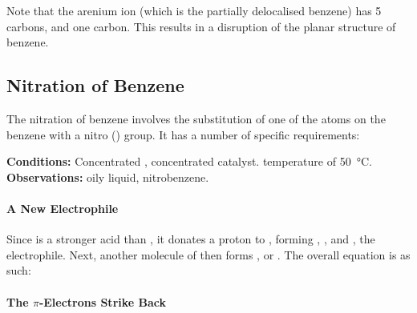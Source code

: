 		Note that the arenium ion (which is the partially delocalised benzene) has 5 \sptwo carbons, and one \spthree carbon. This
		results in a  disruption of the planar structure of benzene.




		\pagebreak
		\subsection{Nitration of Benzene}

			The nitration of benzene involves the substitution of one of the  atoms on the benzene with a nitro () group.
			It has a number of specific requirements:

			\vspace{1.5em}
			\vbox{\textbf{Conditions:}	\tabto{35mm}Concentrated , concentrated  catalyst.
										\tabto{35mm} temperature of \SI{50}{\celsius}.}
			\vspace{0.75em}
			\vbox{\textbf{Observations:}\tabto{35mm} oily liquid, nitrobenzene.}


			\vspace{1.0em}
			\paragraph{A New Electrophile}

			Since  is a stronger acid than , it donates a proton to , forming , , and , the
			electrophile. Next, another molecule of  then forms , or . The overall equation is as such:




			\paragraph{The $\pi$-Electrons Strike Back}

